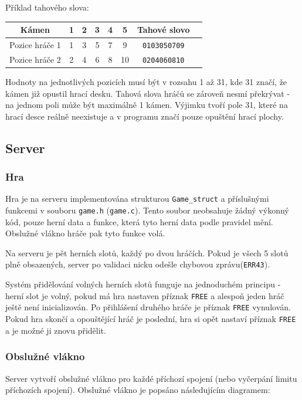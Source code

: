 \documentclass[11pt,a4paper]{scrartcl}
\begin{document}
	Příklad tahového slova:
	
	\begin{center}
		\begin{tabular} {| c || c | c | c | c | c | c | c}
			\hline
			Kámen & 1 & 2 & 3 & 4 & 5 & Tahové slovo\\
			\hline
			\hline
			Pozice hráče 1 & 1& 3& 5& 7& 9 & \verb|0103050709|\\
			\hline
			\hline
			Pozice hráče 2 & 2& 4& 6& 8& 10& \verb|0204060810|\\
						
			\hline
		\end{tabular}
	
	\end{center}
	
	Hodnoty na jednotlivých pozicích musí být v rozsahu 1 až 31, kde 31 značí, že kámen již opustil hrací desku. Tahová slova hráčů se zároveň nesmí překrývat - na jednom poli může být maximálně 1 kámen. Výjimku tvoří pole 31, které na hrací desce reálně neexistuje a v programu značí pouze opuštění hrací plochy.
	
		
	\subsection{Server}
	
	
	\subsubsection{Hra}
	
	Hra je na serveru implementována strukturou \verb|Game_struct| a příslušnými funkcemi v souboru \verb|game.h| (\verb|game.c|). Tento soubor neobsahuje žádný výkonný kód, pouze herní data a funkce, která tyto herní data podle pravidel mění. Obslužné vlákno hráče pak tyto funkce volá.
	
	Na serveru je pět herních slotů, každý po dvou hráčích. Pokud je všech 5 slotů plně obsazených, server po validaci nicku odešle chybovou zprávu(\verb|ERR43|).
	
	Systém přidělování volných herních slotů funguje na jednoduchém principu - herní slot je volný, pokud má hra nastaven příznak \verb|FREE| a alespoň jeden hráč ještě není inicializován. Po přihlášení druhého hráče je příznak \verb|FREE| vynulován. Pokud hra skončí a opouštějící hráč je poslední, hra si opět nastaví příznak \verb|FREE| a je možné ji znovu přidělit.
	
	\subsubsection{Obslužné vlákno}
	Server vytvoří obslužné vlákno pro každé příchozí spojení (nebo vyčerpání limitu příchozích spojení). Obslužné vlákno je popsáno následujícím diagramem:
	
\end{document}
